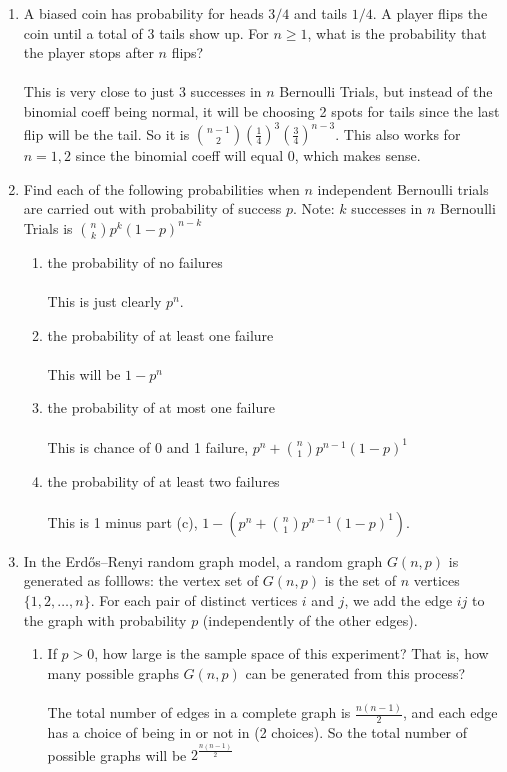 \documentclass[12pt]{article}
\begin{document}
\begin{enumerate}
\medskip

\item A biased coin has probability for heads $3/4$ and tails $1/4$. A player flips the coin until a total of 3 tails show up. For $n \geq 1$, what is the probability that the player stops after $n$ flips?\\\\
This is very close to just 3 successes in $n$ Bernoulli Trials, but instead of the binomial coeff being normal, it will be choosing 2 spots for tails since the last flip will be the tail. So it is $\binom{n-1}{2}(\frac{1}{4})^3(\frac{3}{4})^{n-3}$. This also works for $n=1,2$ since the binomial coeff will equal 0, which makes sense.
\medskip

\item Find each of the following probabilities when $n$ independent Bernoulli trials are carried out with probability of success $p$. Note: $k$ successes in $n$ Bernoulli Trials is $\binom{n}{k}p^k(1-p)^{n-k}$
\begin{enumerate}
\item the probability of no failures\\\\
This is just clearly $p^n$.
\item the probability of at least one failure\\\\
This will be $1-p^n$
\item the probability of at most one failure\\\\
This is chance of 0 and 1 failure, $p^n + \binom{n}{1}p^{n-1}(1-p)^1$
\item the probability of at least two failures\\\\
This is 1 minus part (c), $1- (p^n + \binom{n}{1}p^{n-1}(1-p)^1)$.

\end{enumerate}


\medskip 


\item In the Erd\H{o}s--Renyi random graph model, a random graph $G(n,p)$ is generated as folllows: the vertex set of $G(n,p)$ is the set of $n$ vertices $\{1, 2, \ldots, n\}$. For each pair of distinct vertices $i$ and $j$, we add the edge $ij$ to the graph with probability $p$ (independently of the other edges). 

\begin{enumerate}
\item If $p > 0$, how large is the sample space of this experiment? That is, how many possible graphs $G(n,p)$ can be generated from this process?\\\\
The total number of edges in a complete graph is $\frac{n(n-1)}{2}$, and each edge has a choice of being in or not in (2 choices). So the total number of possible graphs will be $2^\frac{n(n-1)}{2}$


\end{enumerate}
\end{enumerate}
\end{document}
